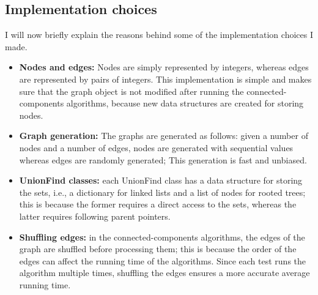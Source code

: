 \documentclass[11pt]{article}
\begin{document}
    \subsection{Implementation choices}
    I will now briefly explain the reasons behind some of the implementation choices I made.
    \begin{itemize}
        \item \textbf{Nodes and edges:} Nodes are simply represented by integers, whereas edges are represented by pairs of integers. This implementation is simple and makes sure that the graph object is not modified after running the connected-components algorithms, because new data structures are created for storing nodes.
        \item \textbf{Graph generation:} The graphs are generated as follows: given a number of nodes and a number of edges, nodes are generated with sequential values whereas edges are randomly generated; This generation is fast and unbiased.
        \item \textbf{UnionFind classes:} each UnionFind class has a data structure for storing the sets, i.e., a dictionary for linked lists and a list of nodes for rooted trees; this is because the former requires a direct access to the sets, whereas the latter requires following parent pointers.
        \item \textbf{Shuffling edges:} in the connected-components algorithms, the edges of the graph are shuffled before processing them; this is because the order of the edges can affect the running time of the algorithms. Since each test runs the algorithm multiple times, shuffling the edges ensures a more accurate average running time.
    \end{itemize}
    
\end{document}
